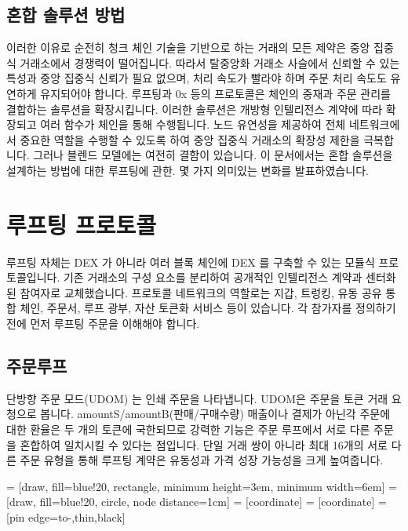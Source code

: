 \documentclass{article}
\makeatletter
\newenvironment{figurehere}
{\def\@captype{figure}}
\makeatother
\begin{document}
\begin{multicols}{2}
\subsection{혼합 솔루션 방법} 

\indent 이러한 이유로 순전히 청크 체인 기술을 기반으로 하는 거래의 모든 제약은 중앙 집중식 거래소에서 경쟁력이 떨어집니다. 따라서 탈중앙화 거래소 사슬에서 신뢰할 수 있는 특성과 중앙 집중식 신뢰가 필요 없으며, 처리 속도가 빨라야 하며 주문 처리 속도도 유연하게 유지되어야 합니다. 루프팅과 0x\cite{warren20170x} 등의 프로토콜은 체인의 중재과 주문 관리를 결합하는 솔루션을 확장시킵니다. 이러한 솔루션은 개방형 인텔리전스 계약에 따라 확장되고 여러 함수가 체인을 통해 수행됩니다. 노드 유연성을 제공하여 전체 네트워크에서 중요한 역할을 수행할 수 있도록 하여 중앙 집중식 거래소의 확장성 제한을 극복합니다. 그러나 블렌드 모델에는 여전히 결함이 있습니다. \cite{costofdecent}이 문서에서는 혼합 솔루션을 설계하는 방법에 대한 루프팅에 관한. 몇 가지 의미있는 변화를 발표하였습니다.

\section{루프팅 프로토콜\label{sec:loopring_protocol}}
\indent 루프팅 자체는 DEX 가 아니라 여러 블록 체인에 DEX 를 구축할 수 있는 모듈식 프로토콜입니다. 기존 거래소의 구성 요소를 분리하여 공개적인 인텔리전스 계약과 센터화된 참여자로 교체했습니다. 프로토콜 네트워크의 역할로는 지갑, 트렁킹, 유동 공유 통합 체인, 주문서, 루프 광부, 자산 토큰화 서비스 등이 있습니다. 각 참가자를 정의하기 전에 먼저 루프팅 주문을 이해해야 합니다. 

\subsection{주문루프\label{sec:order_ring}}
\indent 단방향 주문 모드(UDOM) \cite{coinport2014udom}는 인쇄 주문을 나타냅니다. UDOM은 주문을 토큰 거래 요청으로 봅니다. amountS/amountB(판매/구매수량) 매출이나 결제가 아닌각 주문에 대한 환율은 두 개의 토큰에 국한되므로 강력한 기능은 주문 루프에서 서로 다른 주문을 혼합하여 일치시킬 수 있다는 점입니다. 단일 거래 쌍이 아니라 최대 16개의 서로 다른 주문 유형을 통해 루프팅 계약은 유동성과 가격 성장 가능성을 크게 높여줍니다.

\begin{center}
	\begin{figurehere}
		\centering
		 = [draw, fill=blue!20, rectangle, 
		minimum height=3em, minimum width=6em]
		 = [draw, fill=blue!20, circle, node distance=1cm]
		 = [coordinate]
		 = [coordinate]
		 = [pin edge={to-,thin,black}]
		

\end{figurehere}
\end{center}
\end{multicols}
\end{document}
